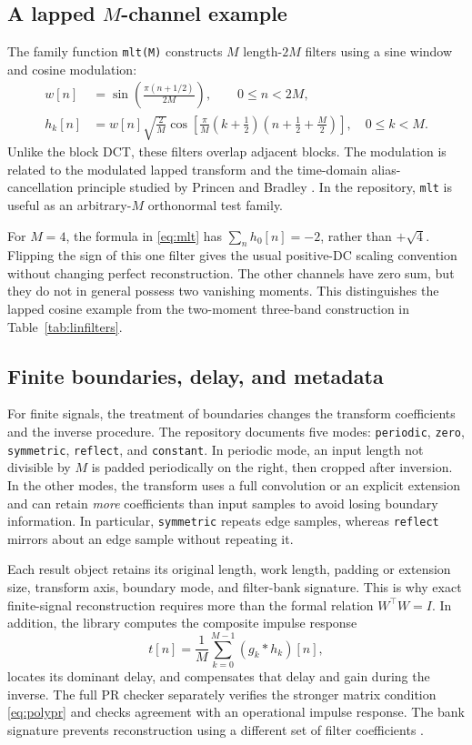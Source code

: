 \documentclass{article}
\theoremstyle{definition}
\theoremstyle{remark}
\newcommand{\code}[1]{\texttt{#1}}
\begin{document}
\subsection{A lapped \texorpdfstring{$M$}{M}-channel example}
The family function \code{mlt(M)} constructs $M$ length-$2M$ filters using a sine window and cosine modulation:
\begin{align}
w[n]&=\sin\!\left(\frac{\pi(n+1/2)}{2M}\right),\qquad 0\le n<2M,\\
h_k[n]&=w[n]\sqrt{\frac2M}\cos\!\left[\frac{\pi}{M}\left(k+\frac12\right)\left(n+\frac12+\frac M2\right)\right],
\quad 0\le k<M.
\label{eq:mlt}
\end{align}
Unlike the block DCT, these filters overlap adjacent blocks. The modulation is related to the modulated lapped transform and the time-domain alias-cancellation principle studied by Princen and Bradley \cite{princen1986}. In the repository, \code{mlt} is useful as an arbitrary-$M$ orthonormal test family.

For $M=4$, the formula in \eqref{eq:mlt} has $\sum_n h_0[n]=-2$, rather than $+\sqrt4$. Flipping the sign of this one filter gives the usual positive-DC scaling convention without changing perfect reconstruction. The other channels have zero sum, but they do not in general possess two vanishing moments. This distinguishes the lapped cosine example from the two-moment three-band construction in Table~\ref{tab:linfilters}.

\subsection{Finite boundaries, delay, and metadata}
For finite signals, the treatment of boundaries changes the transform coefficients and the inverse procedure. The repository documents five modes: \code{periodic}, \code{zero}, \code{symmetric}, \code{reflect}, and \code{constant}. In periodic mode, an input length not divisible by $M$ is padded periodically on the right, then cropped after inversion. In the other modes, the transform uses a full convolution or an explicit extension and can retain \emph{more} coefficients than input samples to avoid losing boundary information. In particular, \code{symmetric} repeats edge samples, whereas \code{reflect} mirrors about an edge sample without repeating it.

Each result object retains its original length, work length, padding or extension size, transform axis, boundary mode, and filter-bank signature. This is why exact finite-signal reconstruction requires more than the formal relation $W^\top W=I$. In addition, the library computes the composite impulse response
\begin{equation}
 t[n]=\frac1M\sum_{k=0}^{M-1}(g_k*h_k)[n],
 \label{eq:composite}
\end{equation}
locates its dominant delay, and compensates that delay and gain during the inverse. The full PR checker separately verifies the stronger matrix condition \eqref{eq:polypr} and checks agreement with an operational impulse response. The bank signature prevents reconstruction using a different set of filter coefficients \cite{su2026}.
\end{document}
